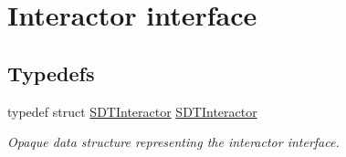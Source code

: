 \hypertarget{group__interactor}{}\section{Interactor interface}
\label{group__interactor}
\subsection*{Typedefs}
\begin{DoxyCompactItemize}
\item 
\hypertarget{group__interactor_gacd68aba5c96532193d9cbc8dfa8f1c8c}{}typedef struct \hyperlink{group__interactor_gacd68aba5c96532193d9cbc8dfa8f1c8c}{S\+D\+T\+Interactor} \hyperlink{group__interactor_gacd68aba5c96532193d9cbc8dfa8f1c8c}{S\+D\+T\+Interactor}\label{group__interactor_gacd68aba5c96532193d9cbc8dfa8f1c8c}

\begin{DoxyCompactList}\small\item\em Opaque data structure representing the interactor interface. \end{DoxyCompactList}\end{DoxyCompactItemize}
